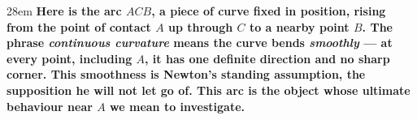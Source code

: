 \documentclass[border=4pt]{standalone}
\begin{document}
\begin{varwidth}{28em}
\large\bfseries
Here is the arc $ACB$, a piece of curve fixed in position, rising from the point of contact $A$ up through $C$ to a nearby point $B$. The phrase \emph{continuous curvature} means the curve bends \emph{smoothly} — at every point, including $A$, it has one definite direction and no sharp corner. This smoothness is Newton's standing assumption, the supposition he will not let go of. This arc is the object whose ultimate behaviour near $A$ we mean to investigate.
\end{varwidth}
\end{document}
